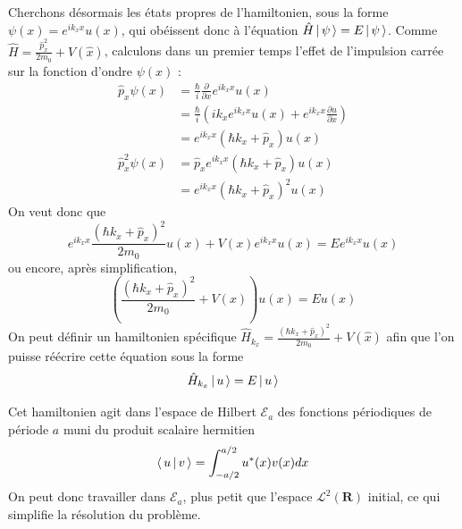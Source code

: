     Cherchons désormais les états propres de l’hamiltonien, sous la forme $\psi(x) = e^{i k_x x} u(x)$, qui obéissent donc à l’équation $\hat{H}\left| \, \psi \, \right> = E\left| \, \psi \, \right>$. Comme $\hat{H} = \frac{\hat{p}_x^2}{2m_0} + V(\hat{x})$, calculons dans un premier temps l’effet de l’impulsion carrée sur la fonction d’ondre $\psi(x)$ : 
    \begin{align*}
        \hat{p}_x\psi(x) 
        &= \frac{\hbar}{i} \frac{\partial }{\partial x} e^{i k_x x} u(x) \\
        &= \frac{\hbar}{i} \left(i k_x e^{i k_x x} u(x) + e^{i k_x x} \frac{\partial u}{\partial x} \right) \\
        &= e^{i k_x x} (\hbar k_x + \hat{p}_x) u(x) \\
        \hat{p}_x^2 \psi(x) 
        &= \hat{p}_x e^{i k_x x} (\hbar k_x + \hat{p}_x) u(x) \\
        &= e^{i k_x x} (\hbar k_x + \hat{p}_x)^2 u(x) 
    \end{align*}
    On veut donc que 
    \[ e^{i k_x x} \frac{(\hbar k_x + \hat{p}_x)^2}{2 m_0} u(x) + V(x) e^{i k_x x} u(x) = E e^{i k_x x } u(x) \]   
    ou encore, après simplification, 
    \[ \left(\frac{(\hbar k_x + \hat{p}_x)^2}{2 m_0} + V(x)\right)u(x) = E u(x) \]   
    On peut définir un hamiltonien spécifique $\hat{H}_{k_x} = \frac{(\hbar k_x + \hat{p}_x)^2}{2 m_0} + V(\hat{x})$ afin que l’on puisse réécrire cette équation sous la forme 
    \[ \hat{H}_{k_x} \left| \, u \, \right> = E \left| \, u \, \right> \] 

    Cet hamiltonien agit dans l’espace de Hilbert $\mathcal{E}_a$ des fonctions périodiques de période $a$ muni du produit scalaire hermitien 
    \[ \left< \, u \, \middle| \, v \, \right> = \int_{-a/2}^{a/2} u^{*}(x) v(x) dx \]   
    On peut donc travailler dans $\mathcal{E}_a$, plus petit que l’espace $\mathcal{L}^2(\mathbf{R})$ initial, ce qui simplifie la résolution du problème.


